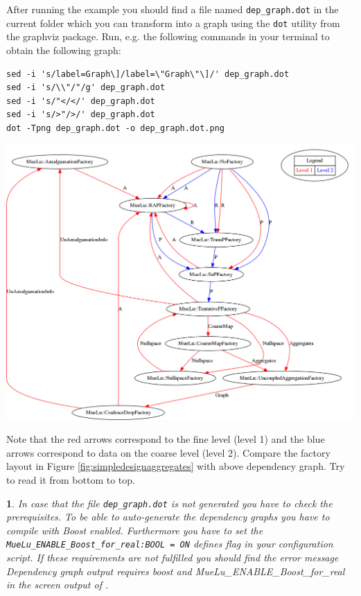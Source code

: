 \documentclass[10pt,fleqn]{book}
\newtheorem*{mycomment}{\ding{42}}
\begin{document}
After running the example you should find a file named \verb|dep_graph.dot| in the current folder which you can transform into a graph using the \verb|dot| utility from the graphviz package.
Run, e.g. the following commands in your terminal to obtain the following graph:
\begin{verbatim}
sed -i 's/label=Graph\]/label=\"Graph\"\]/' dep_graph.dot
sed -i 's/\\"/"/g' dep_graph.dot
sed -i 's/"</</' dep_graph.dot
sed -i 's/>"/>/' dep_graph.dot
dot -Tpng dep_graph.dot -o dep_graph.dot.png
\end{verbatim}
\includegraphics[width=1.0\textwidth]{pics/dep_graph}

Note that the red arrows correspond to the fine level (level 1) and the blue arrows correspond to data on the coarse level (level 2).
Compare the factory layout in Figure \ref{fig:simpledesignaggregates} with above dependency graph. Try to read it from bottom to top.

\begin{mycomment}
In case that the file \verb|dep_graph.dot| is not generated you have to check the prerequisites. To be able to auto-generate the dependency graphs you have to compile \muelu with Boost enabled. Furthermore you have to set the \verb|MueLu_ENABLE_Boost_for_real:BOOL = ON| defines flag in your configuration script. If these requirements are not fulfilled you should find the error message \textit{Dependency graph output requires boost and MueLu\_ENABLE\_Boost\_for\_real} in the screen output of \muelu.
\end{mycomment}
\end{document}
